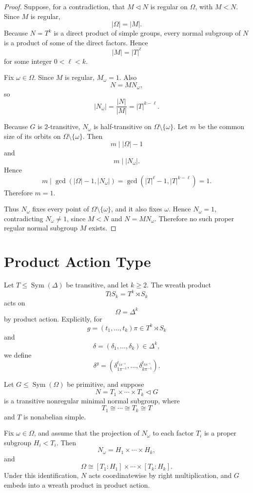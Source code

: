 \begin{proof}
Suppose, for a contradiction, that \(M\lhd N\) is regular on \(\Omega\), with
\(M<N\). Since \(M\) is regular,
\[
|\Omega|=|M|.
\]
Because \(N=T^k\) is a direct product of simple groups, every normal subgroup of
\(N\) is a product of some of the direct factors. Hence
\[
|M|=|T|^\ell
\]
for some integer \(0<\ell<k\).

Fix \(\omega\in \Omega\). Since \(M\) is regular, \(M_\omega=1\). Also
\[
N=MN_\omega,
\]
so
\[
|N_\omega|=\frac{|N|}{|M|}
=
|T|^{k-\ell}.
\]

Because \(G\) is \(2\)-transitive, \(N_\omega\) is half-transitive on
\(\Omega\setminus\{\omega\}\). Let \(m\) be the common size of its orbits on
\(\Omega\setminus\{\omega\}\). Then
\[
m \mid |\Omega|-1
\]
and
\[
m\mid |N_\omega|.
\]
Hence
\[
m \mid \gcd(|\Omega|-1,|N_\omega|)
=
\gcd(|T|^\ell-1,|T|^{k-\ell})
=
1.
\]
Therefore \(m=1\).

Thus \(N_\omega\) fixes every point of \(\Omega\setminus\{\omega\}\), and it also
fixes \(\omega\). Hence \(N_\omega=1\), contradicting \(N_\omega\neq 1\), since
\(M<N\) and \(N=MN_\omega\). Therefore no such proper regular normal subgroup
\(M\) exists.
\end{proof}

\section{Product Action Type}

\begin{definition}
Let \(T\leq \operatorname{Sym}(\Delta)\) be transitive, and let \(k\geq 2\). The
wreath product
\[
T \wr S_k = T^k \rtimes S_k
\]
acts on
\[
\Omega=\Delta^k
\]
by product action. Explicitly, for
\[
g=(t_1,\ldots,t_k)\pi \in T^k\rtimes S_k
\]
and
\[
\delta=(\delta_1,\ldots,\delta_k)\in \Delta^k,
\]
we define
\[
\delta^g
=
(\delta_{1\pi^{-1}}^{t_{1\pi^{-1}}},
 \ldots,
 \delta_{k\pi^{-1}}^{t_{k\pi^{-1}}}).
\]
\end{definition}

\begin{proposition}
Let \(G\leq \operatorname{Sym}(\Omega)\) be primitive, and suppose
\[
N=T_1\times \cdots \times T_k \lhd G
\]
is a transitive nonregular minimal normal subgroup, where
\[
T_1\cong \cdots \cong T_k\cong T
\]
and \(T\) is nonabelian simple.

Fix \(\omega\in \Omega\), and assume that the projection of \(N_\omega\) to each
factor \(T_i\) is a proper subgroup \(H_i<T_i\). Then
\[
N_\omega=H_1\times \cdots \times H_k,
\]
and
\[
\Omega
\cong
[T_1:H_1]\times \cdots \times [T_k:H_k].
\]
Under this identification, \(N\) acts coordinatewise by right multiplication, and
\(G\) embeds into a wreath product in product action.
\end{proposition}

